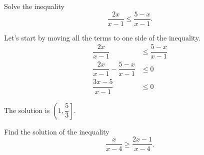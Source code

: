 \documentclass{ximera}
\begin{document}
\begin{example}
	Solve the inequality \[ \dfrac{2x}{x-1} \leq \dfrac{5-x}{x-1}. \] 

	\begin{explanation}
		Let's start by moving all the terms to one side of the inequality.
		\begin{align*}
			\dfrac{2x}{x-1} &\leq \dfrac{5-x}{x-1}\\
			\dfrac{2x}{x-1} - \dfrac{5-x}{x-1} &\leq 0\\
			\dfrac{3x - 5}{x-1} &\leq 0
		\end{align*}
		The solution is $\displaystyle \left( 1, \dfrac{5}{3} \right]$.
	\end{explanation}
\end{example}

\begin{problem}
	Find the solution of the inequality \[ \dfrac{x}{x-4} \geq \dfrac{2x-1}{x-4}. \]
	\begin{multipleChoice}
		\choice[correct]{$\left[1, 4\right)$}
		\choice{$\left(-\infty, 1\right] \bigcup \left(4, \infty\right)$}
	\end{multipleChoice}
\end{problem}
\end{document}
